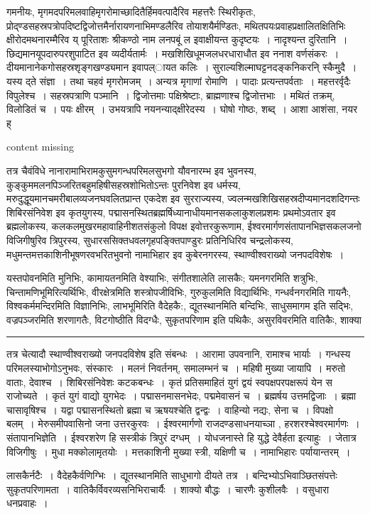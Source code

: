 \documentclass[11pt, openany]{book}
\begin{document}
\newpage

\noindent
गमनीयः, मृगमदपरिमलवाहिमृगरोमाच्छादितैर्हिमवत्पादैरिव महत्तरैः स्थिरीकृतः, प्रोद्ण्डसहस्रपत्रोपदिष्टद्विजोत्तमैर्नारायणनाभिमण्डलैरिव तोयाशयैर्मण्डितः, मथितपयःप्रवाहप्रक्षालितक्षितिभिः क्षीरोदमथनारम्मैरिव य् पूरिताशः श्रीकण्ठो नाम लनपबूं ल इवाक्षीयन्त कुदृष्टयः~। नादृश्यन्त दुरितानि~। छिद्यमानयूपदारुपरशुपाटित इव व्यदीर्यतार्मः~। मखशिखिधूमजलधरधाराधौत इव ननाश वर्णसंकरः~। दीयमानानेकगोसहस्रशृङ्गखण्ड्यमान इवापल्ायत कलिः~। सुराल्यशिल्माघट्टनदङ्कनिकरनि् स्कैमु्दै~। यस्य द्ते संज्ञा~। तथा चहवं मृगरोमजम्~। अन्यत्र मृगाणां रोमाणि~। पादाः प्रत्यन्तपर्वताः~। महत्तरर्वृदैः विपुलेश्च~। सहस्रपत्राणि पञ्मानि~। द्विजोत्तमाः पक्षिश्रेष्टाः, ब्राह्मणाश्च द्विजोत्तभाः~। मथितं तक्रम्, विलोडितं च~। पयः क्षीरम्~। उभयत्रापि नयनन्याद्क्षीरेदस्य~। घोषो गोष्ठः, शब्द्~। आशा आशंसा, नयर ह्

content missing

\newpage

तत्र चैवंविधे नानारामाभिरामकुसुमगन्धपरिमलसुभगो यौवनारम्भ इव भुवनस्य, कुङ्कुममलनपिञ्जरितबहुमहिषीसहस्रशोभितोऽन्तः पुरनिवेश इव धर्मस्य, मरुदुद्धूयमानचमरीबालव्यजनघवलितप्रान्त एकदेश इव सुरराज्यस्य, ज्वलन्मखशिखिसहस्रदीप्यमानदशदिगन्तः शिबिरसंनिवेश इव कृतयुगस्य, पद्मासनस्थितब्रह्मर्षिध्यानाधीयमानसकलाकुशलप्रशमः प्रथमोऽवतार इव ब्रह्मलोकस्य, कलकलमुखरमहावाहिनीशतसंकुलो विपक्ष इवोत्तरकुरूणाम, ईश्वरमार्गणसंतापानभिज्ञसकलजनो विजिगीषुरिव त्रिपुरस्य, सुधारससिक्तधवलगृहपङ्क्तिपाण्डुरः प्रतिनिधिरिव चन्द्रलोकस्य, मधुमन्तमत्तकाशिनीभूषणरवभरितभुवनो नामाभिहार इव कुबेरनगरस्य, स्थाण्वीश्वराख्यो जनपदविशेषः~।

यस्तपोवनमिति मुनिभिः, कामायतनमिति वेश्याभिः, संगीतशालेति लासकैः; यमनगरमिति शत्रुभिः, चिन्तामणिभूमिरित्यर्थिभिः, वीरक्षेत्रमिति शस्त्रोपजीविभिः, गुरुकुलमिति विद्यार्थिभिः, गन्धर्वनगरमिति गायनैः, विश्वकर्ममन्दिरमिति विज्ञानिभिः, लाभभूमिरिति वैदेहकै:, द्यूतस्थानमिति बन्दिभिः, साधुसमागम इति सद्भिः, वज्रपञ्जरमिति शरणागतैः, विटगोष्ठीति विदग्धैः, सुकृतपरिणाम इति पथिकैः, असुरविवरमिति वातिकैः, शाक्या\textendash

\vspace{2mm}
\hrule

{\s तत्र चेत्यादौ स्थाण्वीश्वराख्यो जनपदविशेष इति संबन्धः~। आरामा उपवनानि, रामाश्च भार्याः~। गन्धस्य परिमलस्याभोगोऽनुभवः, संस्कारः~। मलनं निवर्तनम्, समालम्भनं च~। महिषी मुख्या जायापि~। मरुतो वाताः, देवाश्च~। शिबिरसंनिवेशः कटकबन्धः~। कृतं प्रतिसमाहितं युगं द्वयं स्वपक्षपरपक्षरूपं येन स राजोच्यते~। कृतं युगं वाद्यो युगभेदः~। पद्मासनमासनभेदः, पद्ममेवासनं च~। ब्रह्मर्षय उत्तमद्विजाः~। ब्रह्मा चासावृषिश्च~। यद्वा पद्मासनस्थितो ब्रह्मा च ऋषयश्चेति द्वन्द्वः~। वाहिन्यो नद्यः, सेना च~। विपक्षो बलम्~। मेरुसमीपवासिनो जना उत्तरकुरवः~। ईश्वरमार्गणो राजदण्डसाधनयाच्ञा , हरशरश्चेश्वरमार्गणः~। संतापानभिज्ञेति~। ईश्वरशरेण हि सस्त्रीकं त्रिपुरं दग्धम्~। योधजनास्ते हि युद्धे देवैर्हता इत्याहुः~। जेतात्र विजिगीषुः~। {\qt मुधा मक्कोलामृतयोः}~। मत्तकाशिनी मुख्या स्त्री, यक्षिणी च~। नामाभिहारः पर्यायान्तरम्~।

लासकैर्नटैः~। वैदेहकैर्वणिग्भिः~। द्यूतस्थानमिति साधुभागो दीयते तत्र~। बन्दिभ्योऽभिवाञ्छितसंपत्तेः सुकृतपरिणामता~। वातिकैर्विवरव्यसनिभिराचार्यैः~। शाक्यो बौद्धः~। चारणैः कुशीलवैः~। वसुधारा धनप्रवाहः~।}
\end{document}
